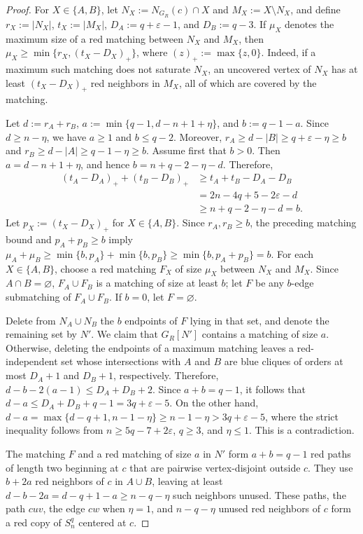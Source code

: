 \documentclass[11pt]{article}
\theoremstyle{definition}
\theoremstyle{remark}
\begin{document}
\begin{proof}
For \(X\in\{A,B\}\), let \(N_X:=N_{G_R}(c)\cap X\) and
\(M_X:=X\setminus N_X\), and define \(r_X:=|N_X|\),
\(t_X:=|M_X|\), \(D_A:=q+\varepsilon-1\), and \(D_B:=q-3\).
If \(\mu_X\) denotes the maximum size of a red matching between
\(N_X\) and \(M_X\), then
\(\mu_X\geq\min\{r_X,(t_X-D_X)_+\}\),
where \((z)_+:=\max\{z,0\}\). Indeed, if a maximum such matching
does not saturate \(N_X\), an uncovered vertex of \(N_X\) has at
least \((t_X-D_X)_+\) red neighbors in \(M_X\), all of which are
covered by the matching.

Let \(d:=r_A+r_B\), \(a:=\min\{q-1,d-n+1+\eta\}\), and
\(b:=q-1-a\).
Since \(d\geq n-\eta\), we have \(a\geq1\) and \(b\leq q-2\).
Moreover,
\(r_A\geq d-|B|\geq q+\varepsilon-\eta\geq b\) and \(r_B\geq d-|A|\geq q-1-\eta\geq b\).
Assume first that \(b>0\). Then \(a=d-n+1+\eta\), and hence
\(b=n+q-2-\eta-d\).
Therefore,
\begin{align*}
 (t_A-D_A)_++(t_B-D_B)_+
 &\geq t_A+t_B-D_A-D_B\\
 &=2n-4q+5-2\varepsilon-d\\
 &\geq n+q-2-\eta-d=b.
\end{align*}
Let \(p_X:=(t_X-D_X)_+\) for \(X\in\{A,B\}\).
Since \(r_A,r_B\geq b\), the preceding matching bound and
\(p_A+p_B\geq b\) imply
\(\mu_A+\mu_B\geq \min\{b,p_A\}+\min\{b,p_B\} \geq \min\{b,p_A+p_B\}=b\).
For each \(X\in\{A,B\}\), choose a red matching \(F_X\) of size
\(\mu_X\) between \(N_X\) and \(M_X\). Since \(A\cap B=\varnothing\),
\(F_A\cup F_B\) is a matching of size at least \(b\); let \(F\) be
any \(b\)-edge submatching of \(F_A\cup F_B\). If \(b=0\), let
\(F=\varnothing\).

Delete from \(N_A\cup N_B\) the \(b\) endpoints of \(F\) lying in
that set, and denote the remaining set by \(N'\). We claim that
\(G_R[N']\) contains a matching of size \(a\). Otherwise, deleting
the endpoints of a maximum matching leaves a red-independent set
whose intersections with \(A\) and \(B\) are blue cliques of orders
at most \(D_A+1\) and \(D_B+1\), respectively. Therefore,
\(d-b-2(a-1)\leq D_A+D_B+2\).
Since \(a+b=q-1\), it follows that
\(d-a\leq D_A+D_B+q-1=3q+\varepsilon-5\).
On the other hand,
\(d-a =\max\{d-q+1,n-1-\eta\} \geq n-1-\eta >3q+\varepsilon-5\),
where the strict inequality follows from
\(n\geq5q-7+2\varepsilon\), \(q\geq3\), and \(\eta\leq1\).
This is a contradiction.

The matching \(F\) and a red matching of size \(a\) in \(N'\)
form \(a+b=q-1\) red paths of length two beginning at \(c\) that are
pairwise vertex-disjoint outside \(c\). They use \(b+2a\) red neighbors of \(c\) in
\(A\cup B\), leaving at least
\(d-b-2a=d-q+1-a\geq n-q-\eta\) such neighbors unused. These paths,
the path \(cuv\), the edge
\(cw\) when \(\eta=1\), and \(n-q-\eta\) unused red neighbors of
\(c\) form a red copy of \(S_n^q\) centered at \(c\).
\end{proof}
\end{document}
